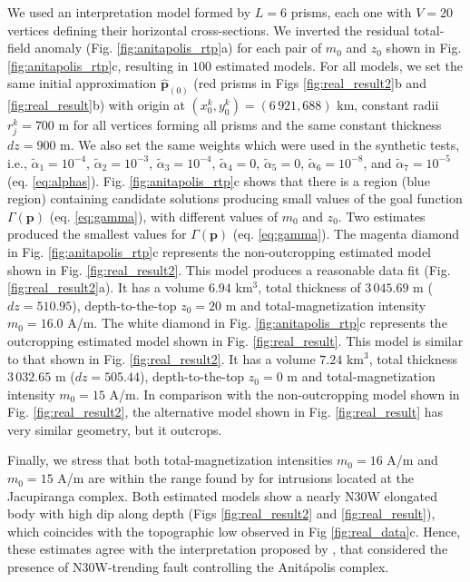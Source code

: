 We used an interpretation model formed by $L = 6$ prisms, each one with 
$V = 20$ vertices defining their horizontal cross-sections.
We inverted the residual total-field anomaly (Fig. \ref{fig:anitapolis_rtp}a) for each 
pair of $m_0$ and $z_0$ shown in Fig. \ref{fig:anitapolis_rtp}c, resulting in $100$ estimated 
models. 
For all models, we set the same initial approximation $\hat{\mathbf{p}}_{(0)}$ 
(red prisms in Figs \ref{fig:real_result2}b and \ref{fig:real_result}b) 
with origin at $(x_0^k, y_0^k) = (6\,921, 688)$ km, constant radii $r_j^k = 700$ m for 
all vertices forming all prisms and the same constant thickness $dz = 900$ m.
We also set the same weights which were used in the synthetic tests, i.e., 
$\tilde{\alpha}_1 = 10^{-4}$, 
$\tilde{\alpha}_2 = 10^{-3}$, 
$\tilde{\alpha}_3 = 10^{-4}$, 
$\tilde{\alpha}_4 = 0$, 
$\tilde{\alpha}_5 = 0$, 
$\tilde{\alpha}_6 = 10^{-8}$, and 
$\tilde{\alpha}_7 = 10^{-5}$ (eq. \ref{eq:alphas}). 
Fig. \ref{fig:anitapolis_rtp}c shows that there is a region (blue region) containing 
candidate solutions producing small values of the goal function 
$\Gamma(\mathbf{p})$ (eq. \ref{eq:gamma}), with different values of $m_0$ and $z_0$.
Two estimates produced the smallest values for $ \Gamma(\mathbf{p}) $ (eq. \ref{eq:gamma}). 
The magenta diamond in Fig. \ref{fig:anitapolis_rtp}c represents the 
non-outcropping estimated model shown in Fig. \ref{fig:real_result2}. 
This model produces a reasonable data fit (Fig. \ref{fig:real_result2}a). 
It has a volume $ 6.94 $ km$ ^3 $, total thickness of $ 3\,045.69 $ m 
($ dz = 510.95 $), depth-to-the-top $z_0 = 20$ m and total-magnetization intensity 
$m_0 = 16.0$ A/m.
The white diamond in Fig. \ref{fig:anitapolis_rtp}c represents the outcropping estimated  
model shown in Fig. \ref{fig:real_result}. This model is similar to that shown in 
Fig. \ref{fig:real_result2}. It has a volume $ 7.24 $ km$ ^3 $, total thickness 
$ 3\,032.65 $ m ($ dz = 505.44 $), depth-to-the-top $z_0 = 0$ m and 
total-magnetization intensity $m_0 = 15$ A/m.  
In comparison with the non-outcropping model shown in Fig. \ref{fig:real_result2}, the 
alternative model shown in Fig. \ref{fig:real_result} has very similar geometry,
but it outcrops.

Finally, we stress that both total-magnetization intensities $m_0 = 16$  A/m and  $m_0 = 15$ A/m 
are within the range found by  \citet{valdivia-2009} for intrusions located at the Jacupiranga complex.
Both estimated models show a nearly N30W elongated body with high dip 
along depth (Figs \ref{fig:real_result2} and \ref{fig:real_result}), 
which coincides with the topographic low observed in Fig \ref{fig:real_data}c. 
Hence, these estimates agree with the interpretation proposed by 
\citet{horbach-marimon1980}, that considered the presence of N30W-trending fault 
controlling the Anit{\'a}polis complex.